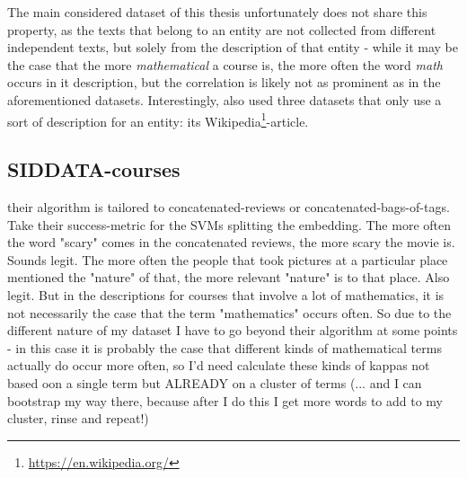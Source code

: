 The main considered dataset of this thesis unfortunately does not share this property, as the texts that belong to an entity are not collected from different independent texts, but solely from the description of that entity - while it may be the case that the more \emph{mathematical} a course is, the more often the word \emph{math} occurs in it description, but the correlation is likely not as prominent as in the aforementioned datasets. Interestingly, \cite{Alshaikh2020} also used three datasets that only use a sort of description for an entity: its Wikipedia\footnote{\url{https://en.wikipedia.org/}}-article.


\subsection{SIDDATA-courses}


their algorithm is tailored to concatenated-reviews or concatenated-bags-of-tags. Take their success-metric for the SVMs splitting the embedding. The more often the word "scary" comes in the concatenated reviews, the more scary the movie is. Sounds legit. The more often the people that took pictures at a particular place mentioned the "nature" of that, the more relevant "nature" is to that place. Also legit. But in the descriptions for courses that involve a lot of mathematics, it is not necessarily the case that the term "mathematics" occurs often. So due to the different nature of my dataset I have to go beyond their algorithm at some points - in this case it is probably the case that different kinds of mathematical terms actually do occur more often, so I'd need calculate these kinds of kappas not based oon a single term but ALREADY on a cluster of terms (... and I can bootstrap my way there, because after I do this I get more words to add to my cluster, rinse and repeat!)

